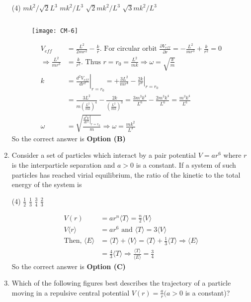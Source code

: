 \begin{enumerate}
\begin{tasks}(4)
\task[\textbf{A.}] $m k^{2} / \sqrt{2} L^{3}$
\task[\textbf{B.}] $m k^{2} / L^{3}$
\task[\textbf{C.}] $\sqrt{2} m k^{2} / L^{3}$
\task[\textbf{D.}] $\sqrt{3} m k^{2} / L^{3}$
\end{tasks}
\begin{answer}$\left. \right. $
\begin{figure}[H]
	\centering
	\texttt{[image: CM-6]}
\end{figure}
\begin{align*}
V_{e f f}&=\frac{L^{2}}{2 m r^{2}}-\frac{k}{r} .\text{ For circular orbit }\frac{\partial V_{e f f}}{\partial r}=-\frac{L^{2}}{m r^{3}}+\frac{k}{r^{2}}=0\\
\Rightarrow \frac{L^{2}}{m r^{3}}&=\frac{k}{r^{2}} .\text{ Thus }r=r_{0}=\frac{L^{2}}{m k} \Rightarrow \omega=\sqrt{\frac{k}{m}}\\
k&=\left.\frac{d^{2} V_{e f f}}{d r^{2}}\right|_{r=r_{0}}=+\frac{3 L^{2}}{m r^{4}}-\left.\frac{2 k}{r^{3}}\right|_{r=r_{0}}\\&=\frac{3 L^{2}}{m\left(\frac{L^{2}}{m k}\right)^{4}}-\frac{2 k}{\left(\frac{L^{2}}{m k}\right)^{3}}=\frac{3 m^{3} k^{4}}{L^{6}}-\frac{2 m^{3} k^{4}}{L^{6}}=\frac{m^{3} k^{4}}{L^{6}}\\
\omega&=\sqrt{\frac{\left.\frac{d^{2} V}{d r^{2}}\right|_{r=r_{0}}}{m}} \Rightarrow \omega=\frac{m k^{2}}{L^{3}}
\end{align*}
So the correct answer is \textbf{Option (B)}
\end{answer}
	\item Consider a set of particles which interact by a pair potential $V=a r^{6}$ where $r$ is the interparticle separation and $a>0$ is a constant. If a system of such particles has reached virial equilibrium, the ratio of the kinetic to the total energy of the system is

\begin{tasks}(4)
\task[\textbf{A.}] $\frac{1}{2}$
\task[\textbf{B.}] $\frac{1}{3}$
\task[\textbf{C.}] $\frac{3}{4}$
\task[\textbf{D.}] $\frac{2}{3}$
\end{tasks}
\begin{answer}
\begin{align*}
V(r)&=a r^{n}\langle T\rangle=\frac{n}{2}\langle V\rangle\\
V\langle r\rangle&=a r^{6}\text{ and }\langle T\rangle=3\langle V\rangle\\
\text{Then, }\langle E\rangle&=\langle T\rangle+\langle V\rangle=\langle T\rangle+\frac{1}{3}\langle T\rangle \Rightarrow\langle E\rangle\\&=\frac{4}{3}\langle T\rangle \Rightarrow \frac{\langle T\rangle}{\langle E\rangle}=\frac{3}{4}
\end{align*}
So the correct answer is \textbf{Option (C)}
\end{answer}
	\item Which of the following figures best describes the trajectory of a particle moving in a repulsive central potential $V(r)=\frac{a}{r}(a>0$ is a constant)?


\end{enumerate}
